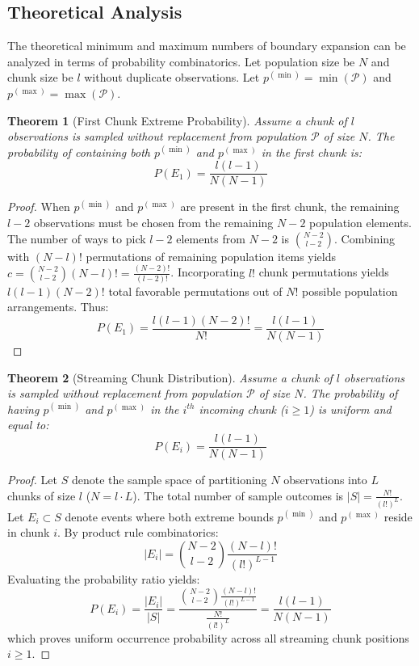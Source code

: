 \documentclass[a4paper,fleqn]{cas-sc}
\newtheorem{theorem}{Theorem}
\begin{document}
\subsection{Theoretical Analysis}
The theoretical minimum and maximum numbers of boundary expansion can be analyzed in terms of probability combinatorics. Let population size be $N$ and chunk size be $l$ without duplicate observations. Let $p^{(\min)} = \min(\mathcal{P})$ and $p^{(\max)} = \max(\mathcal{P})$.

\begin{theorem}[First Chunk Extreme Probability]
Assume a chunk of $l$ observations is sampled without replacement from population $\mathcal{P}$ of size $N$. The probability of containing both $p^{(\min)}$ and $p^{(\max)}$ in the first chunk is:
\begin{equation}
P(E_1) = \frac{l(l-1)}{N(N-1)}
\end{equation}
\end{theorem}
\begin{proof}
When $p^{(\min)}$ and $p^{(\max)}$ are present in the first chunk, the remaining $l-2$ observations must be chosen from the remaining $N-2$ population elements. The number of ways to pick $l-2$ elements from $N-2$ is $\binom{N-2}{l-2}$. Combining with $(N-l)!$ permutations of remaining population items yields $c = \binom{N-2}{l-2}(N-l)! = \frac{(N-2)!}{(l-2)!}$. Incorporating $l!$ chunk permutations yields $l(l-1)(N-2)!$ total favorable permutations out of $N!$ possible population arrangements. Thus:
\begin{equation}
P(E_1) = \frac{l(l-1)(N-2)!}{N!} = \frac{l(l-1)}{N(N-1)}
\end{equation}
\end{proof}

\begin{theorem}[Streaming Chunk Distribution]
Assume a chunk of $l$ observations is sampled without replacement from population $\mathcal{P}$ of size $N$. The probability of having $p^{(\min)}$ and $p^{(\max)}$ in the $i^{th}$ incoming chunk ($i \ge 1$) is uniform and equal to:
\begin{equation}
P(E_i) = \frac{l(l-1)}{N(N-1)}
\end{equation}
\end{theorem}
\begin{proof}
Let $S$ denote the sample space of partitioning $N$ observations into $L$ chunks of size $l$ ($N = l \cdot L$). The total number of sample outcomes is $|S| = \frac{N!}{(l!)^L}$. Let $E_i \subset S$ denote events where both extreme bounds $p^{(\min)}$ and $p^{(\max)}$ reside in chunk $i$. By product rule combinatorics:
\begin{equation}
|E_i| = \binom{N-2}{l-2} \frac{(N-l)!}{(l!)^{L-1}}
\end{equation}
Evaluating the probability ratio yields:
\begin{equation}
P(E_i) = \frac{|E_i|}{|S|} = \frac{\binom{N-2}{l-2}\frac{(N-l)!}{(l!)^{L-1}}}{\frac{N!}{(l!)^L}} = \frac{l(l-1)}{N(N-1)}
\end{equation}
which proves uniform occurrence probability across all streaming chunk positions $i \ge 1$.
\end{proof}
\end{document}
